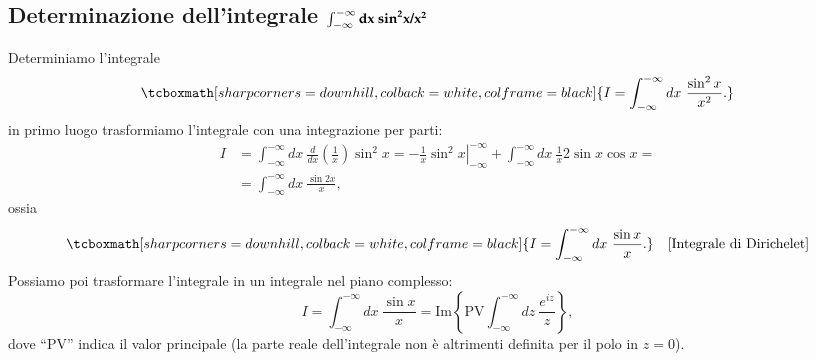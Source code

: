\documentclass[a4paper,12pt,oneside]{book}
\newcommand*{\myfont}{\fontfamily{ppl}\selectfont}
\begin{document}
\subsection{Determinazione dell'integrale $\int _{-\infty} ^{-\infty} \myfont{\textbf{dx}}\ \myfont{\textbf{sin}} ^{\myfont{\textbf{2}}} \myfont{\textbf{x/}}\myfont{\textbf{x}}^{\myfont{\textbf{2}}}$}
Determiniamo l'integrale
	\begin{equation}
		\tcboxmath[sharp corners=downhill, colback=white, colframe=black]{
			I= \int _{-\infty} ^{-\infty} dx\ \frac{\sin ^2 x}{x^2}.
			}
	\end{equation}
in primo luogo trasformiamo l'integrale con una integrazione per parti:
	\begin{align}
		I &= \int _{-\infty} ^{-\infty} dx\ \frac{d}{dx}\left(\frac{1}{x}\right)\sin ^2 x =  \left. -\frac{1}{x}\sin ^2 x\right\vert _{-\infty} ^{-\infty} +\int _{-\infty} ^{-\infty} dx\ \frac{1}{x} 2 \sin x \cos x  =\nonumber \\
		&= \int _{-\infty} ^{-\infty} dx\ \frac{\sin 2 x}{x}, 
	\end{align}
ossia
	\begin{equation}
		\tcboxmath[sharp corners=downhill, colback=white, colframe=black]{
		I= \int _{-\infty} ^{-\infty} dx\ \frac{\sin  x}{x}.
		} \quad \textrm{[Integrale di Dirichelet]}
	\end{equation}
Possiamo poi trasformare l'integrale in un integrale nel piano complesso:
	\begin{equation}
		I= \int _{-\infty} ^{-\infty} dx\ \frac{\sin  x}{x}= \textrm{Im}\left\{\textrm{PV} \int _{-\infty} ^{-\infty} dz\ \frac{e^{iz}}{z}\right\},
	\label{eq:cap15_14}
	\end{equation}
dove ``PV'' indica il valor principale (la parte reale dell'integrale non è altrimenti definita per il polo in $z=0$). \newpage
\end{document}
